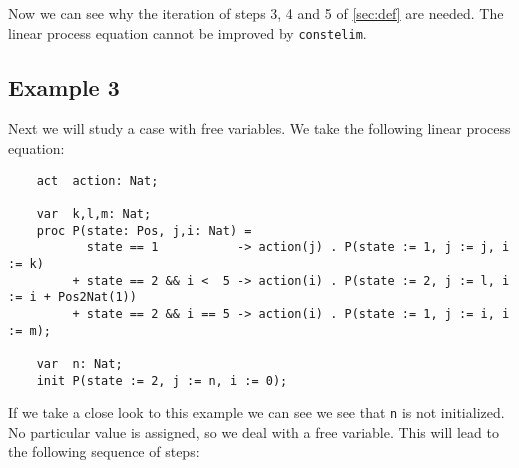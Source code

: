 \documentclass[a4paper,9pt]{article}
\begin{document}
Now we can see why the iteration of steps 3, 4 and 5 of \ref{sec:def} are needed. The linear process equation cannot be improved by \verb"constelim".

\subsection{Example 3} 
Next we will study a case with free variables. We take the following linear process equation:
\begin{verbatim}
    act  action: Nat;

    var  k,l,m: Nat;
    proc P(state: Pos, j,i: Nat) =
           state == 1           -> action(j) . P(state := 1, j := j, i := k)
         + state == 2 && i <  5 -> action(i) . P(state := 2, j := l, i := i + Pos2Nat(1))
         + state == 2 && i == 5 -> action(i) . P(state := 1, j := i, i := m);

    var  n: Nat;
    init P(state := 2, j := n, i := 0);
\end{verbatim}
If we take a close look to this example we can see we see that \verb"n" is not initialized. No particular value is assigned, so we deal with a free variable. \newline
This will lead to the following sequence of steps:\\
\end{document}

